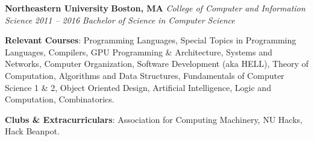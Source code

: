 \item
\headerrow
{\textbf{Northeastern University}}
{\textbf{Boston, MA}}
\headerrow
{\emph{College of Computer and Information Science}}
{\emph{2011 -- 2016}}
{\emph{Bachelor of Science in Computer Science}}
\begin{itemize*}
    \item \textbf{Relevant Courses}: Programming Languages, Special Topics in
    Programming Languages, Compilers, GPU Programming \& Architecture, Systems
    and Networks, Computer Organization, Software Development (aka HELL),
    Theory of Computation, Algorithms and Data Structures, Fundamentals of
    Computer Science 1 \& 2, Object Oriented Design, Artificial Intelligence,
    Logic and Computation, Combinatorics.
    \item \textbf{Clubs \& Extracurriculars}: Association for Computing
    Machinery, NU Hacks, Hack Beanpot.
\end{itemize*}
